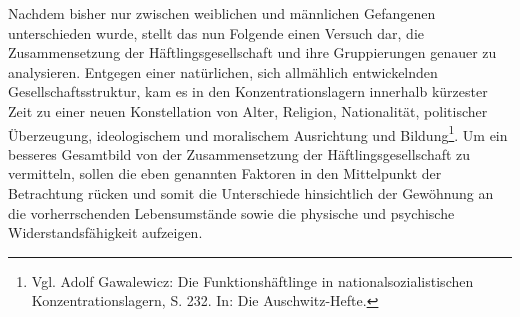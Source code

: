 Nachdem bisher nur zwischen weiblichen und männlichen Gefangenen unterschieden wurde, stellt das nun Folgende einen Versuch dar, die Zusammensetzung der Häftlingsgesellschaft und ihre Gruppierungen genauer zu analysieren. \newline
Entgegen einer natürlichen, sich allmählich entwickelnden Gesellschaftsstruktur, kam es in den Konzentrationslagern innerhalb kürzester Zeit zu einer neuen Konstellation von Alter, Religion, Nationalität, politischer Überzeugung, ideologischem und moralischem Ausrichtung und Bildung\footnote{Vgl. Adolf Gawalewicz: Die Funktionshäftlinge in nationalsozialistischen Konzentrationslagern, S. 232. In: Die Auschwitz-Hefte.}. Um ein besseres Gesamtbild von der Zusammensetzung der Häftlingsgesellschaft zu vermitteln, sollen die eben genannten Faktoren in den Mittelpunkt der Betrachtung rücken und somit die Unterschiede hinsichtlich der Gewöhnung an die vorherrschenden Lebensumstände sowie die physische und psychische Widerstandsfähigkeit aufzeigen.


